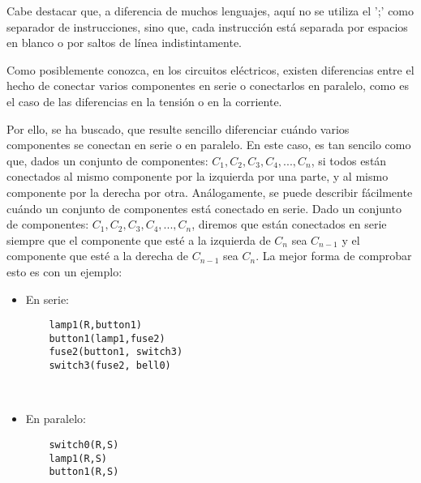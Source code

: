 \documentclass{article}
\begin{document}
Cabe destacar que, a diferencia de muchos lenguajes, aquí no se utiliza el ';' como separador de instrucciones, sino que, cada instrucción está separada por espacios en blanco o por saltos de línea indistintamente.

Como posiblemente conozca, en los circuitos eléctricos, existen diferencias entre el hecho de conectar varios componentes en serie o conectarlos en paralelo, como es el caso de las diferencias en la tensión o en la corriente.

Por ello, se ha buscado, que resulte sencillo diferenciar cuándo varios componentes se conectan en serie o en paralelo. En este caso, es tan sencilo como que, dados un conjunto de componentes: $C_1,C_2,C_3, C_4,...,C_n$, si todos están conectados al mismo componente por la izquierda por una parte, y al mismo componente por la derecha por otra. Análogamente, se puede describir fácilmente cuándo un conjunto de componentes está conectado en serie. Dado un conjunto de componentes: $C_1,C_2,C_3, C_4,...,C_n$, diremos que están conectados en serie siempre que el componente que esté a la izquierda de $C_{n}$ sea $C_{n-1}$ y el componente que esté a la derecha de $C_{n-1}$ sea $C_{n}$. La mejor forma de comprobar esto es con un ejemplo:

\begin{itemize}
  \item En serie:
  \begin{lstlisting}
    lamp1(R,button1)
    button1(lamp1,fuse2)
    fuse2(button1, switch3)
    switch3(fuse2, bell0)
  \end{lstlisting}

  \

  \item En paralelo:
  \begin{lstlisting}
    switch0(R,S)
    lamp1(R,S)
    button1(R,S)
  \end{lstlisting}

\end{itemize}
\end{document}
